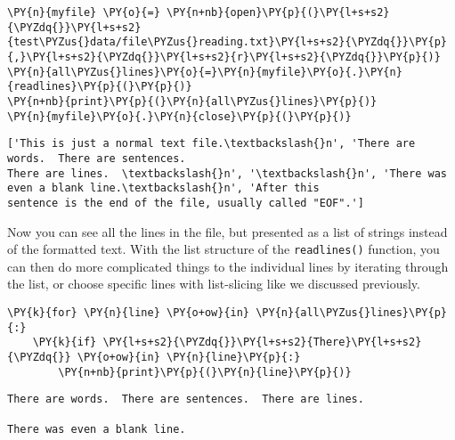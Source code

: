     \begin{tcolorbox}[breakable, size=fbox, boxrule=1pt, pad at break*=1mm,colback=cellbackground, colframe=cellborder]
\begin{Verbatim}[commandchars=\\\{\}]
\PY{n}{myfile} \PY{o}{=} \PY{n+nb}{open}\PY{p}{(}\PY{l+s+s2}{\PYZdq{}}\PY{l+s+s2}{test\PYZus{}data/file\PYZus{}reading.txt}\PY{l+s+s2}{\PYZdq{}}\PY{p}{,}\PY{l+s+s2}{\PYZdq{}}\PY{l+s+s2}{r}\PY{l+s+s2}{\PYZdq{}}\PY{p}{)}
\PY{n}{all\PYZus{}lines}\PY{o}{=}\PY{n}{myfile}\PY{o}{.}\PY{n}{readlines}\PY{p}{(}\PY{p}{)}
\PY{n+nb}{print}\PY{p}{(}\PY{n}{all\PYZus{}lines}\PY{p}{)}
\PY{n}{myfile}\PY{o}{.}\PY{n}{close}\PY{p}{(}\PY{p}{)}
\end{Verbatim}
\end{tcolorbox}

    \begin{Verbatim}[commandchars=\\\{\}]
['This is just a normal text file.\textbackslash{}n', 'There are words.  There are sentences.
There are lines.  \textbackslash{}n', '\textbackslash{}n', 'There was even a blank line.\textbackslash{}n', 'After this
sentence is the end of the file, usually called "EOF".']
    \end{Verbatim}

    Now you can see all the lines in the file, but presented as a list of
strings instead of the formatted text. With the list structure of the
\texttt{readlines()} function, you can then do more complicated things
to the individual lines by iterating through the list, or choose
specific lines with list-slicing like we discussed previously.

    \begin{tcolorbox}[breakable, size=fbox, boxrule=1pt, pad at break*=1mm,colback=cellbackground, colframe=cellborder]
\begin{Verbatim}[commandchars=\\\{\}]
\PY{k}{for} \PY{n}{line} \PY{o+ow}{in} \PY{n}{all\PYZus{}lines}\PY{p}{:}
    \PY{k}{if} \PY{l+s+s2}{\PYZdq{}}\PY{l+s+s2}{There}\PY{l+s+s2}{\PYZdq{}} \PY{o+ow}{in} \PY{n}{line}\PY{p}{:}
        \PY{n+nb}{print}\PY{p}{(}\PY{n}{line}\PY{p}{)}
\end{Verbatim}
\end{tcolorbox}

    \begin{Verbatim}[commandchars=\\\{\}]
There are words.  There are sentences.  There are lines.

There was even a blank line.

    \end{Verbatim}

